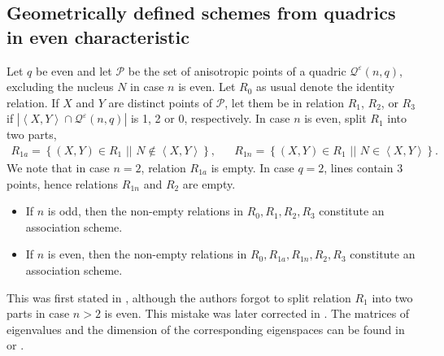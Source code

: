 \documentclass[a4paper]{article}
\theoremstyle{definition}
\newcommand{\eps}{\varepsilon}
\newcommand{\vspan}[1]{\left \langle #1 \right \rangle}
\newcommand{\sett}[2]{ \left\{ #1 \, \, || \, \, #2 \right \} }
\newcommand{\pp}{\mathcal P}
\newcommand{\mq}{\mathcal Q}
\begin{document}
\subsection{Geometrically defined schemes from quadrics in even characteristic}

Let $q$ be even and let $\pp$ be the set of anisotropic points of a quadric $\mq^\eps(n,q)$, excluding the nucleus $N$ in case $n$ is even.
Let $R_0$ as usual denote the identity relation.
If $X$ and $Y$ are distinct points of $\pp$, let them be in relation $R_1$, $R_2$, or $R_3$ if $|\vspan{X,Y} \cap \mq^\eps(n,q)|$ is 1, 2 or 0, respectively.
In case $n$ is even, split $R_1$ into two parts,
\begin{align*}
 R_{1a} = \sett{(X,Y) \in R_1}{ N \notin \vspan{X,Y} }, &&
 R_{1n} = \sett{(X,Y) \in R_1}{ N \in \vspan{X,Y} }.
\end{align*}
We note that in case $n=2$, relation $R_{1a}$ is empty.
In case $q=2$, lines contain 3 points, hence relations $R_{1n}$ and $R_2$ are empty.
\begin{itemize}
 \item If $n$ is odd, then the non-empty relations in $R_0,R_1,R_2,R_3$ constitute an association scheme.
 \item If $n$ is even, then the non-empty relations in $R_0,R_{1a},R_{1n},R_2,R_3$ constitute an association scheme.
\end{itemize}
This was first stated in \cite[Theorem 12.1.1]{bcn}, although the authors forgot to split relation $R_1$ into two parts in case $n>2$ is even.
This mistake was later corrected in \cite{vanhove20}. %
The matrices of eigenvalues and the dimension of the corresponding eigenspaces can be found in \cite{vanhove20} or \cite[\S 3.1.1]{brouwervanmaldeghem}.
\end{document}
